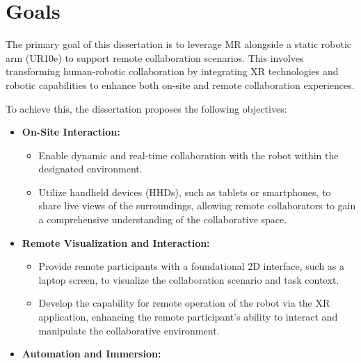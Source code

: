 \section{Goals}
% 
The primary goal of this dissertation is to leverage \ac{MR} alongside a static robotic arm (UR10e) to support remote collaboration scenarios. 
This involves transforming human-robotic collaboration by integrating \ac{XR} technologies and robotic capabilities to enhance both on-site and 
remote collaboration experiences.

To achieve this, the dissertation proposes the following objectives:

\begin{itemize}
    \item \textbf{On-Site Interaction:}
    \begin{itemize}
        \item Enable dynamic and real-time collaboration with the robot within the designated environment.
        \item Utilize handheld devices (HHDs), such as tablets or smartphones, to share live views of the surroundings, allowing remote collaborators 
        to gain a comprehensive understanding of the collaborative space.
    \end{itemize}
    \item \textbf{Remote Visualization and Interaction:}
    \begin{itemize}
        \item Provide remote participants with a foundational 2D interface, such as a laptop screen, to visualize the collaboration scenario and 
        task context.
        \item Develop the capability for remote operation of the robot via the \ac{XR} application, enhancing the remote participant's ability to 
        interact and manipulate the collaborative environment.
    \end{itemize}
    \item \textbf{Automation and Immersion:}
    \begin{itemize}

\end{itemize}
\end{itemize}
